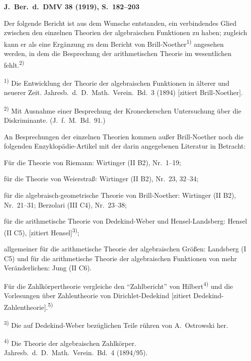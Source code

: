 \documentclass[12pt,a4paper]{article}
\begin{document}
\noindent\textbf{J.\ Ber.\ d.\ DMV 38 (1919), S.\ 182--203}

\medskip

Der folgende Bericht ist aus dem Wunsche entstanden, ein verbindendes Glied zwischen den einzelnen Theorien der algebraischen Funktionen zu haben; zugleich kann er als eine Erg\"anzung zu dem Bericht von Brill-Noether\textsuperscript{1)} angesehen werden, in dem die Besprechung der arithmetischen Theorie im wesentlichen fehlt.\textsuperscript{2)}

\smallskip
\noindent\textsuperscript{1)} Die Entwicklung der Theorie der algebraischen Funktionen in \"alterer und neuerer Zeit. Jahresb.\ d.\ D.\ Math.\ Verein.\ Bd.\ 3 (1894) [zitiert Brill-Noether].

\smallskip
\noindent\textsuperscript{2)} Mit Ausnahme einer Besprechung der Kroneckerschen Untersuchung \"uber die Diskriminante. (J.\ f.\ M.\ Bd.\ 91.)

\medskip

An Besprechungen der einzelnen Theorien kommen au\ss{}er Brill-Noether noch die folgenden Enzyklop\"adie-Artikel mit der darin angegebenen Literatur in Betracht:

F\"ur die Theorie von Riemann: Wirtinger (II B2), Nr.\ 1--19;

f\"ur die Theorie von Weierstra\ss{}: Wirtinger (II B2), Nr.\ 23, 32--34;

f\"ur die algebraisch-geometrische Theorie von Brill-Noether: Wirtinger (II B2), Nr.\ 21--31; Berzolari (III C4), Nr.\ 23--38;

f\"ur die arithmetische Theorie von Dedekind-Weber und Hensel-Landsberg: Hensel (II C5), [zitiert Hensel]\textsuperscript{3)};

allgemeiner f\"ur die arithmetische Theorie der algebraischen Gr\"o\ss{}en: Landsberg (I C5) und f\"ur die arithmetische Theorie der algebraischen Funktionen von mehr Ver\"anderlichen: Jung (II C6).

F\"ur die Zahlk\"orpertheorie vergleiche den ``Zahlbericht'' von Hilbert\textsuperscript{4)} und die Vorlesungen \"uber Zahlentheorie von Dirichlet-Dedekind [zitiert Dedekind-Zahlentheorie].\textsuperscript{5)}

\smallskip
\noindent\textsuperscript{3)} Die auf Dedekind-Weber bez\"uglichen Teile r\"uhren von A.\ Ostrowski her.

\smallskip
\noindent\textsuperscript{4)} Die Theorie der algebraischen Zahlk\"orper. Jahresb.\ d.\ D.\ Math.\ Verein.\ Bd.\ 4 (1894/95).
\end{document}
